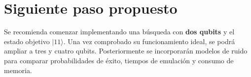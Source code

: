 \documentclass[11pt,a4paper]{article}
\begin{document}
\section{Siguiente paso propuesto}

Se recomienda comenzar implementando una búsqueda con \textbf{dos qubits} y el estado objetivo $\lvert 11\rangle$. Una vez comprobado su funcionamiento ideal, se podrá ampliar a tres y cuatro qubits. Posteriormente se incorporarán modelos de ruido para comparar probabilidades de éxito, tiempos de emulación y consumo de memoria.
\end{document}
